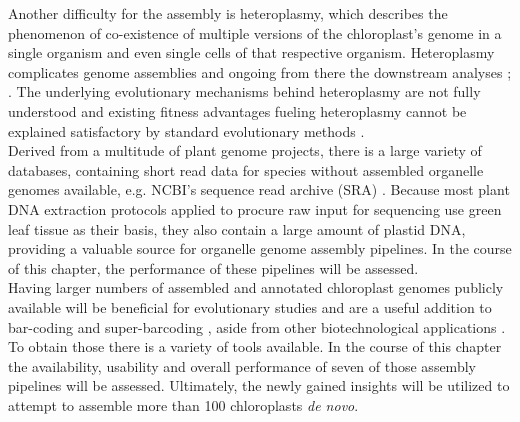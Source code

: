 Another difficulty for the assembly is heteroplasmy, which describes the phenomenon of
co-existence of multiple versions of the chloroplast's genome in a single organism and
even single cells of that respective organism. Heteroplasmy complicates genome assemblies
and ongoing from there the downstream analyses \cite{corriveau_1988}; \cite{Chat2002}. The
underlying evolutionary mechanisms behind heteroplasmy are not fully understood and
existing fitness advantages fueling heteroplasmy cannot be explained satisfactory by
standard evolutionary methods
\cite{Scar2016}. \\

Derived from a multitude of plant genome projects, there is a large variety of databases,
containing short read data for species without assembled organelle genomes available,
e.g. NCBI's sequence read archive (SRA) \cite{SRA2010}. Because most plant DNA extraction
protocols applied to procure raw input for sequencing use green leaf tissue as their
basis, they also contain a large amount of plastid DNA, providing a valuable source for
organelle genome assembly pipelines. In the course of this chapter, the performance of
these pipelines will be assessed.\\
Having larger numbers of assembled and annotated chloroplast genomes publicly available
will be beneficial for evolutionary studies and are a useful addition to bar-coding and
super-barcoding \cite{coissac_barcodes_2016}, aside from other biotechnological
applications \cite{daniell_chloroplast_2016}. To obtain those there is a variety of tools
available. In the course of this chapter the availability, usability and overall
performance of seven of those assembly pipelines will be assessed. Ultimately, the newly
gained insights will be utilized to attempt to assemble more than 100
chloroplasts \textit{de novo}.

